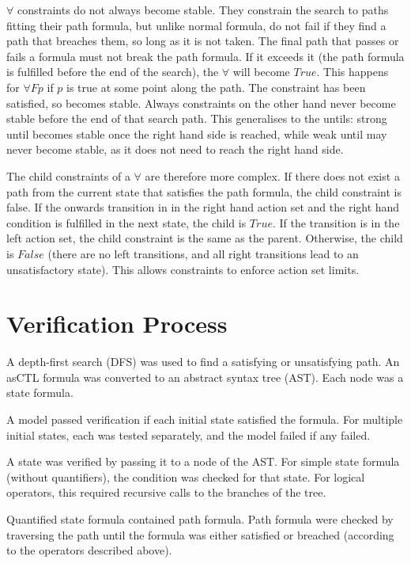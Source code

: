 \documentclass[a4paper,11pt]{article}
\begin{document}
	$\forall$ constraints do not always become stable. They constrain the search to paths fitting their path formula, but unlike normal formula, do not fail if they find a path that breaches them, so long as it is not taken. The final path that passes or fails a formula must not break the path formula. If it exceeds it (the path formula is fulfilled before the end of the search), the $\forall$ will become $True$. This happens for $\forall F p$ if $p$ is true at some point along the path. The constraint has been satisfied, so becomes stable. Always constraints on the other hand never become stable before the end of that search path. This generalises to the untils: strong until becomes stable once the right hand side is reached, while weak until may never become stable, as it does not need to reach the right hand side. 
	
	The child constraints of a $\forall$ are therefore more complex. If there does not exist a path from the current state that satisfies the path formula, the child constraint is false. If the onwards transition in in the right hand action set and the right hand condition is fulfilled in the next state, the child is $True$. If the transition is in the left action set, the child constraint is the same as the parent. Otherwise, the child is $False$ (there are no left transitions, and all right transitions lead to an unsatisfactory state). This allows constraints to enforce action set limits.
	
	\section{Verification Process}
	A depth-first search (DFS) was used to find a satisfying or unsatisfying path. An asCTL formula was converted to an abstract syntax tree (AST). Each node was a state formula. 
	
	A model passed verification if each initial state satisfied the formula. For multiple initial states, each was tested separately, and the model failed if any failed.
	
	A state was verified by passing it to a node of the AST. For simple state formula (without quantifiers), the condition was checked for that state. For logical operators, this required recursive calls to the branches of the tree.
	
	Quantified state formula contained path formula. Path formula were checked by traversing the path until the formula was either satisfied or breached (according to the operators described above).
	
\end{document}
